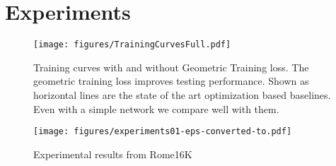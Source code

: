\documentclass[10pt,twocolumn,letterpaper]{article}
\begin{document}
\section{Experiments}

\begin{figure*}
\begin{center}
  \texttt{[image: figures/TrainingCurvesFull.pdf]}
  \end{center}
    \caption{
      Training curves with and without Geometric Training loss.
      The geometric training loss improves testing performance.
      Shown as horizontal lines are the state of the art optimization based baselines.
      Even with a simple network we compare well with them.
    }
  \label{fig:short}
\end{figure*}

\begin{figure*}
\begin{center}
  \texttt{[image: figures/experiments01-eps-converted-to.pdf]}
  \end{center}
     \caption{Experimental results from Rome16K}
  \label{fig:short}
\end{figure*}
\end{document}

